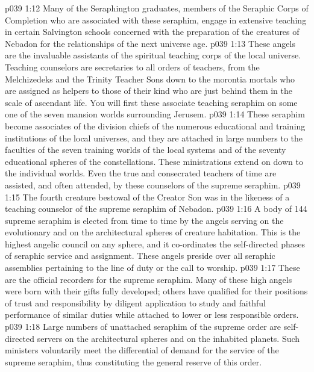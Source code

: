 \vs p039 1:12 Many of the Seraphington graduates, members of the Seraphic Corps of Completion who are associated with these seraphim, engage in extensive teaching in certain Salvington schools concerned with the preparation of the creatures of Nebadon for the relationships of the next universe age.
\vs p039 1:13 \pc {}\bibnobreakspace {} These angels are the invaluable assistants of the spiritual teaching corps of the local universe. Teaching counselors are secretaries to all orders of teachers, from the Melchizedeks and the Trinity Teacher Sons down to the morontia mortals who are assigned as helpers to those of their kind who are just behind them in the scale of ascendant life. You will first  these associate teaching seraphim on some one of the seven mansion worlds surrounding Jerusem.
\vs p039 1:14 These seraphim become associates of the division chiefs of the numerous educational and training institutions of the local universes, and they are attached in large numbers to the faculties of the seven training worlds of the local systems and of the seventy educational spheres of the constellations. These ministrations extend on down to the individual worlds. Even the true and consecrated teachers of time are assisted, and often attended, by these counselors of the supreme seraphim.
\vs p039 1:15 The fourth creature bestowal of the Creator Son was in the likeness of a teaching counselor of the supreme seraphim of Nebadon.
\vs p039 1:16 \pc {}\bibnobreakspace {} A body of 144 supreme seraphim is elected from time to time by the angels serving on the evolutionary and on the architectural spheres of creature habitation. This is the highest angelic council on any sphere, and it co\hyp{}ordinates the self\hyp{}directed phases of seraphic service and assignment. These angels preside over all seraphic assemblies pertaining to the line of duty or the call to worship.
\vs p039 1:17 \pc {}\bibnobreakspace {} These are the official recorders for the supreme seraphim. Many of these high angels were born with their gifts fully developed; others have qualified for their positions of trust and responsibility by diligent application to study and faithful performance of similar duties while attached to lower or less responsible orders.
\vs p039 1:18 \pc {}\bibnobreakspace {} Large numbers of unattached seraphim of the supreme order are self\hyp{}directed servers on the architectural spheres and on the inhabited planets. Such ministers voluntarily meet the differential of demand for the service of the supreme seraphim, thus constituting the general reserve of this order.
